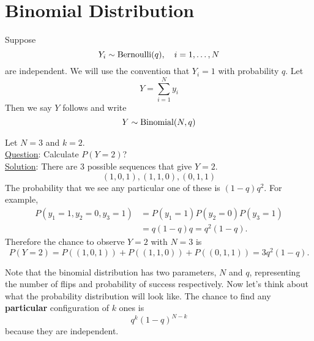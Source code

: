   \section{Binomial Distribution}
 Suppose 
  \begin{equation*}
  Y_i \sim {\rm Bernoulli}(q),\quad i =1,\dots, N
  \end{equation*} 
  are independent. We will use the convention that $Y_i=1$ with probability $q$. Let
\begin{equation*}
Y = \sum_{i=1}^N y_i
\end{equation*}
 Then we say $Y$ follows  and write
\begin{equation*}
Y \sim {\rm Binomial}(N,q)
\end{equation*}

 
 
 \begin{example}
Let $N=3$ and $k=2$. \\

\noindent
\underline{Question}: Calculate $P(Y=2)$?\\

\noindent
\underline{Solution}: There are 3 possible sequences that give $Y=2$. 
\begin{equation*}
(1,0,1),(1,1,0),(0,1,1)
\end{equation*}
The probability that we see any particular one of these is $(1-q)q^2$. For example, 
\begin{align*}
P(y_1 = 1,y_2 = 0,y_3 = 1) &= P(y_1 = 1)P(y_2=0)P(y_3 =1) \\
&= q(1-q)q = q^2(1-q).
\end{align*}
Therefore the chance to observe $Y=2$ with $N=3$ is
\begin{equation*}
P(Y=2) = P((1,0,1)) +P((1,1,0))  + P((0,1,1))  =  3q^2(1-q). 
\end{equation*}


 \end{example}
 
 Note that the binomial distribution has two parameters, $N$ and $q$, representing the number of flips and probability of success respectively. 
 Now let's think about what the probability distribution will look like. The chance to find any {\bf particular} configuration of $k$ ones is 
\begin{equation*}
q^k(1-q)^{N-k}
\end{equation*}
 because they are independent. \\
 
